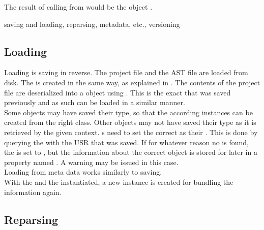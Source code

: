 The result of calling  from  would be the  object .

saving and loading, reparsing, metadata, etc., versioning

\subsection{Loading}

Loading is saving in reverse. The project file and the  AST file are loaded from disk. The  is created in the same way, as explained in . The contents of the project file are deserialized into a  object using . This is the exact  that was saved previously and as such can be loaded in a similar manner.\\
Some objects may have saved their type, so that the according instances can be created from the right class. Other objects may not have saved their type as it is retrieved by the given context. s need to set the correct  as their . This is done by querying the  with the USR that was saved. If for whatever reason no  is found, the  is set to , but the information about the correct object is stored for later in a property named . A warning may be issued in this case.\\
Loading from meta data works similarly to saving.\\
With the  and the  instantiated, a new  instance is created for bundling the information again.

\subsection{Reparsing}

